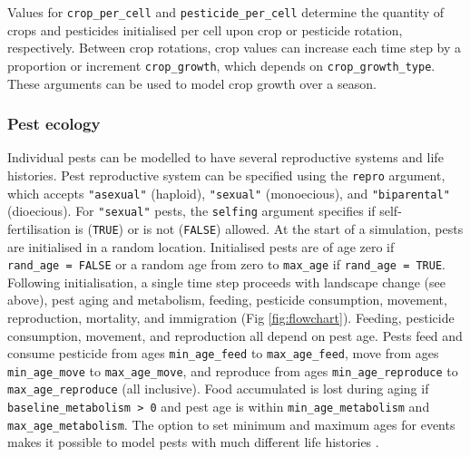 \documentclass[
]{article}
\begin{document}
Values for \texttt{crop\_per\_cell} and \texttt{pesticide\_per\_cell} determine the quantity of crops and pesticides initialised per cell upon crop or pesticide rotation, respectively.
Between crop rotations, crop values can increase each time step by a proportion or increment \texttt{crop\_growth}, which depends on \texttt{crop\_growth\_type}.
These arguments can be used to model crop growth over a season.

\hypertarget{ecology}{%
\subsubsection{Pest ecology}\label{ecology}}

Individual pests can be modelled to have several reproductive systems and life histories.
Pest reproductive system can be specified using the \texttt{repro} argument, which accepts \texttt{"asexual"} (haploid), \texttt{"sexual"} (monoecious), and \texttt{"biparental"} (dioecious).
For \texttt{"sexual"} pests, the \texttt{selfing} argument specifies if self-fertilisation is (\texttt{TRUE}) or is not (\texttt{FALSE}) allowed.
At the start of a simulation, pests are initialised in a random location.
Initialised pests are of age zero if \texttt{rand\_age\ =\ FALSE} or a random age from zero to \texttt{max\_age} if \texttt{rand\_age\ =\ TRUE}.
Following initialisation, a single time step proceeds with landscape change (see above), pest aging and metabolism, feeding, pesticide consumption, movement, reproduction, mortality, and immigration (Fig \ref{fig:flowchart}).
Feeding, pesticide consumption, movement, and reproduction all depend on pest age.
Pests feed and consume pesticide from ages \texttt{min\_age\_feed} to \texttt{max\_age\_feed}, move from ages \texttt{min\_age\_move} to \texttt{max\_age\_move}, and reproduce from ages \texttt{min\_age\_reproduce} to \texttt{max\_age\_reproduce} (all inclusive).
Food accumulated is lost during aging if \texttt{baseline\_metabolism\ \textgreater{}\ 0} and pest age is within \texttt{min\_age\_metabolism} and \texttt{max\_age\_metabolism}.
The option to set minimum and maximum ages for events makes it possible to model pests with much different life histories \citep[e.g.,][]{Sudo2018}.
\end{document}
